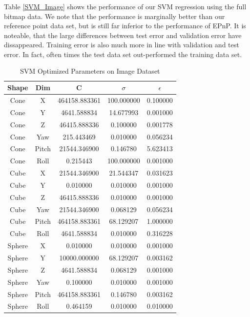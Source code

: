 \documentclass[journal]{IEEEtran}
\begin{document}
Table \ref{SVM_Image} shows the performance of our SVM regression using the full bitmap data. We note that the performance is marginally better than our reference point data set, but is still far inferior to the performance of EPnP. It is noteable, that the large differences between test error and validation error have dissappeared. Training error is also much more in line with validation and test error. In fact, often times the test data set out-performed the training data set.

\begin{table}[h]
\caption{SVM Optimized Parameters on Image Dataset}
\label{SVM_Image_Parms}
\centering

\begin{tabular}{|c|c|c|c|c|}
\hline
Shape & Dim & C & $\sigma$ & $\epsilon$\\
\hline
Cone & X & 464158.883361 & 100.000000 & 0.100000\\
Cone & Y & 4641.588834 & 14.677993 & 0.001000\\
Cone & Z & 46415.888336 & 0.100000 & 0.001778\\
Cone & Yaw & 215.443469 & 0.010000 & 0.056234\\
Cone & Pitch & 21544.346900 & 0.146780 & 5.623413\\
Cone & Roll & 0.215443 & 100.000000 & 0.001000\\
\hline
Cube & X & 21544.346900 & 21.544347 & 0.031623\\
Cube & Y & 0.010000 & 0.010000 & 0.001000\\
Cube & Z & 46415.888336 & 0.010000 & 0.001000\\
Cube & Yaw & 21544.346900 & 0.068129 & 0.056234\\
Cube & Pitch & 464158.883361 & 68.129207 & 1.000000\\
Cube & Roll & 4641.588834 & 0.010000 & 0.316228\\
\hline
Sphere & X & 0.010000 & 0.010000 & 0.001000\\
Sphere & Y & 10000.000000 & 68.129207 & 0.003162\\
Sphere & Z & 4641.588834 & 0.068129 & 0.001000\\
Sphere & Yaw & 0.100000 & 0.010000 & 0.001000\\
Sphere & Pitch & 464158.883361 & 0.146780 & 0.003162\\
Sphere & Roll & 0.464159 & 0.010000 & 0.010000\\
\hline

\end{tabular}

\end{table}
\end{document}
